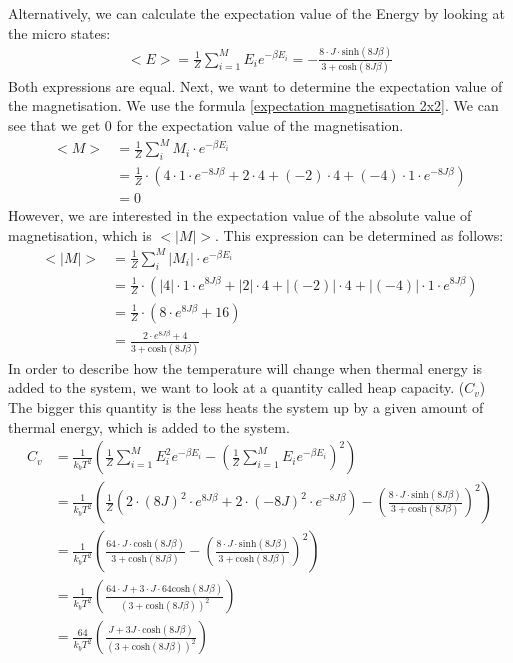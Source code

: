 \documentclass[10pt,a4paper]{article}
\begin{document}
Alternatively, we can calculate the expectation value of the Energy by looking at the micro states:
\begin{align}
<E> = \frac{1}{Z} \sum_{i=1}^{M} E_i e^{- \beta E_i}=-\frac{8 \cdot J \cdot  \mathrm{sinh}(8J \beta ) }{3+\mathrm{cosh}(8J\beta)}
\end{align}
Both expressions are equal. Next, we want to determine the expectation value of the magnetisation. We use the formula \ref{expectation magnetisation 2x2}. We can see that we get 0 for the expectation value of the magnetisation. 
\begin{align}
<M> &= \frac{1}{Z} \sum_{i}^M M_i \cdot e^{- \beta E_i }\\\label{expectation magnetisation 2x2}
&= \frac{1}{Z} \cdot \left( 4 \cdot 1 \cdot e^{-8J\beta}+ 2 \cdot 4+(-2) \cdot 4 + (-4) \cdot 1 \cdot e^{-8J \beta } \right)\\
&=0
\end{align}
However, we are interested in the expectation value of the absolute value of magnetisation, which is $<|M|>$. This expression can be determined as follows:
\begin{align}
<|M|> &= \frac{1}{Z} \sum_{i}^M |M_i| \cdot e^{- \beta E_i }\\\label{expectation absolute magnetisation 2x2}
&= \frac{1}{Z} \cdot \left( |4| \cdot 1 \cdot e^{8J\beta}+ |2| \cdot 4+|(-2)| \cdot 4 + |(-4)| \cdot 1 \cdot e^{8J \beta } \right)\\
&=\frac{1}{Z} \cdot \left( 8 \cdot e^{8J\beta} +16 \right)\\
&= \frac{2 \cdot e^{8J\beta}+4}{3+ \mathrm{cosh}(8J\beta)}
\end{align}
In order to describe how the temperature will change when thermal energy is added to the system, we want to look at a quantity called heap capacity. ($C_v$) The bigger this quantity is the less heats the system up by a given amount of thermal energy, which is added to the system.  
\begin{align}
C_v &= \frac{1}{k_b T^2} \left( \frac{1}{Z} \sum_{i=1}^{M} E_i^2 e^{- \beta E_i } - \left( \frac{1}{Z} \sum_{i=1}^{M} E_i e^{- \beta E_i }  \right)^2 \right)\\
&=\frac{1}{k_b T^2} \left( \frac{1}{Z} \left( 2 \cdot (8J)^2 \cdot e^{8J \beta}+2 \cdot (-8J)^2 \cdot e^{-8J \beta} \right) - \left( \frac{8 \cdot J \cdot  \mathrm{sinh}(8J \beta ) }{3+\mathrm{cosh}(8J\beta)} \right)^2 \right)\\
&=\frac{1}{k_b T^2} \left( \frac{64\cdot J\cdot \mathrm{cosh}(8 J \beta )}{3+\mathrm{cosh}(8J\beta)}  - \left( \frac{8 \cdot J \cdot \mathrm{sinh}(8J \beta ) }{3+\mathrm{cosh}(8J\beta)} \right)^2 \right)\\
&= \frac{1}{k_b T^2} \left( \frac{64 \cdot J +3\cdot J \cdot 64 \mathrm{cosh}(8J \beta)}{\left(3+\mathrm{cosh}(8J\beta)\right)^2} \right)\\
&= \frac{64}{k_b T^2} \left( \frac{ J +3 J \cdot \mathrm{cosh}(8J \beta)}{\left(3+\mathrm{cosh}(8J\beta)\right)^2} \right)\\
\end{align}
\end{document}
